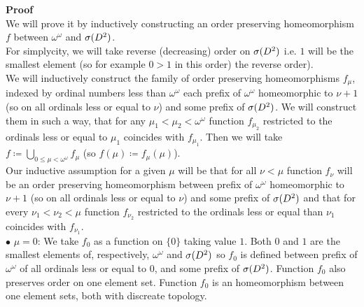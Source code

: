 \textbf{Proof} \\
We will prove it by inductively constructing an order preserving homeomorphism $f$ between 
$\omega^\omega$ and ${{\sigma}(D^2)}$. \\
For simplycity, we will take reverse (decreasing) order on ${{\sigma}(D^2)}$ i.e. $1$ will be the smallest 
 element 
(so for example $0 > 1$ in this order)
the reverse order).  \\
We will inductively construct the family of order preserving homeomorphisms $f_\mu$, 
indexed by ordinal numbers less 
than 
$\omega^\omega$ each 
prefix of $\omega^\omega$ homeomorphic to $\nu + 1$ (so on all ordinals less 
or equal to $\nu$) 
and some prefix of ${{\sigma}(D^2)}$. We will construct them in such a way, that for any $\mu_1 < \mu_2 
< \omega^\omega$ function $f_{\mu_2}$ restricted to the ordinals less or equal to 
$\mu_1$ coincides with $f_{\mu_1}$.
Then we will take $f \coloneqq \bigcup\limits_{0 \leq \mu < 
\omega^\omega} f_\mu$ (so $f(\mu) \coloneqq f_\mu(\mu)$). \\
Our inductive assumption for a given $\mu$ will be that 
for all $\nu < \mu$ function $f_\nu$ will be an order preserving homeomorphism 
between prefix of $\omega^\omega$ homeomorphic to $\nu + 1$ (so on all ordinals less 
or equal to $\nu$) 
and some prefix of ${{\sigma}(D^2)}$ and that for every $\nu_1 < \nu_2 < \mu$ function $f_{\nu_2}$ 
restricted to the ordinals less or equal than $\nu_1$ coincides with $f_{\nu_1}$. \\ 
$\bullet$ $\mu = 0$: We take $f_0$ as a function on $\{0\}$ taking value $1$. 
Both $0$ and $1$ are the smallest elements of, respectively, $\omega^\omega$ and ${{\sigma}(D^2)}$ 
so $f_0$ is defined between prefix of $\omega^\omega$ of all ordinals less or equal to $0$, and 
some prefix of ${{\sigma}(D^2)}$. 
Function $f_0$ also preserves order on one element set.
Function $f_0$ is an homeomorphism between one element sets, both with discreate topology. \\
